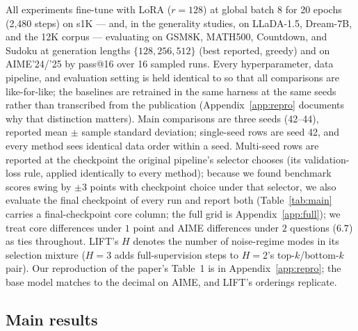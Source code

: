 \documentclass{article} %
\begin{document}
All experiments fine-tune with LoRA ($r{=}128$) at global batch 8 for 20 epochs (2{,}480 steps) on s1K \citep{muennighoff2025s1} --- and, in the generality studies, on LLaDA-1.5, Dream-7B, and the 12K corpus --- evaluating on GSM8K, MATH500, Countdown, and Sudoku at generation lengths $\{128, 256, 512\}$ (best reported, greedy) and on AIME'24/'25 by pass@16 over 16 sampled runs. Every hyperparameter, data pipeline, and evaluation setting is held identical to \citet{lift2026} so that all comparisons are like-for-like; the baselines are retrained in the same harness at the same seeds rather than transcribed from the publication (Appendix~\ref{app:repro} documents why that distinction matters). Main comparisons are three seeds (42--44), reported mean $\pm$ sample standard deviation; single-seed rows are seed 42, and every method sees identical data order within a seed. Multi-seed rows are reported at the checkpoint the original pipeline's selector chooses (its validation-loss rule, applied identically to every method); because we found benchmark scores swing by $\pm 3$ points with checkpoint choice under that selector, we also evaluate the final checkpoint of every run and report both (Table~\ref{tab:main} carries a final-checkpoint core column; the full grid is Appendix~\ref{app:full}); we treat core differences under $1$ point and AIME differences under $2$ questions ($6.7$) as ties throughout. LIFT's $H$ denotes the number of noise-regime modes in its selection mixture ($H{=}3$ adds full-supervision steps to $H{=}2$'s top-$k$/bottom-$k$ pair). Our reproduction of the paper's Table~1 is in Appendix~\ref{app:repro}; the base model matches to the decimal on AIME, and LIFT's orderings replicate.

\subsection{Main results}
\end{document}
